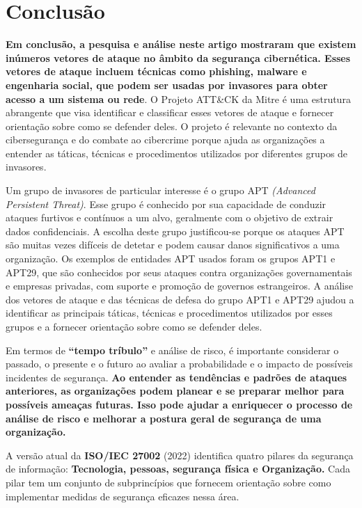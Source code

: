 \chapter{Conclusão}

\textbf{Em conclusão, a pesquisa e análise neste artigo mostraram que existem inúmeros vetores de ataque no âmbito da segurança cibernética. Esses vetores de ataque incluem técnicas como phishing, malware e engenharia social, que podem ser usadas por invasores para obter acesso a um sistema ou rede}. O Projeto ATT\&CK da Mitre é uma estrutura abrangente que visa identificar e classificar esses vetores de ataque e fornecer orientação sobre como se defender deles. O projeto é relevante no contexto da cibersegurança e do combate ao cibercrime porque ajuda as organizações a entender as táticas, técnicas e procedimentos utilizados por diferentes grupos de invasores.

Um grupo de invasores de particular interesse é o grupo APT \textit{(Advanced Persistent Threat)}. Esse grupo é conhecido por sua capacidade de conduzir ataques furtivos e contínuos a um alvo, geralmente com o objetivo de extrair dados confidenciais. A escolha deste grupo justificou-se porque os ataques APT são muitas vezes difíceis de detetar e podem causar danos significativos a uma organização. Os exemplos de entidades APT usados foram os grupos APT1 e APT29, que são conhecidos por seus ataques contra organizações governamentais e empresas privadas, com suporte e promoção de governos estrangeiros. A análise dos vetores de ataque e das técnicas de defesa do grupo APT1 e APT29 ajudou a identificar as principais táticas, técnicas e procedimentos utilizados por esses grupos e a fornecer orientação sobre como se defender deles.

Em termos de \textbf{``tempo tríbulo''} e análise de risco, é importante considerar o passado, o presente e o futuro ao avaliar a probabilidade e o impacto de possíveis incidentes de segurança. \textbf{Ao entender as tendências e padrões de ataques anteriores, as organizações podem planear e se preparar melhor para possíveis ameaças futuras. Isso pode ajudar a enriquecer o processo de análise de risco e melhorar a postura geral de segurança de uma organização.}

A versão atual da \textbf{ISO/IEC 27002} (2022) identifica quatro pilares da segurança de informação: \textbf{Tecnologia, pessoas, segurança física e Organização.} Cada pilar tem um conjunto de subprincípios que fornecem orientação sobre como implementar medidas de segurança eficazes nessa área.

